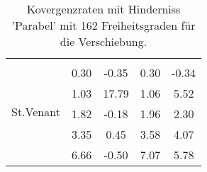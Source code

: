 \begin{table}
\begin{tabular}{c|cc|cc|}
\hline 
\multicolumn{1}{|c|}{\multirow{6}{*}{St.Venant}} &\multicolumn{1}{|c|}{} & \multicolumn{1}{|c|}{} & \multicolumn{1}{|c|}{} & \multicolumn{1}{|c|}{} \\ 
\multicolumn{1}{|c|}{} & \multicolumn{1}{|c|}{      0.30} & \multicolumn{1}{|c|}{     -0.35} & \multicolumn{1}{|c|}{      0.30} & \multicolumn{1}{|c|}{     -0.34} \\ 
\multicolumn{1}{|c|}{} & \multicolumn{1}{|c|}{      1.03} & \multicolumn{1}{|c|}{     17.79} & \multicolumn{1}{|c|}{      1.06} & \multicolumn{1}{|c|}{      5.52} \\ 
\multicolumn{1}{|c|}{} & \multicolumn{1}{|c|}{      1.82} & \multicolumn{1}{|c|}{     -0.18} & \multicolumn{1}{|c|}{      1.96} & \multicolumn{1}{|c|}{      2.30} \\ 
\multicolumn{1}{|c|}{} & \multicolumn{1}{|c|}{      3.35} & \multicolumn{1}{|c|}{      0.45} & \multicolumn{1}{|c|}{      3.58} & \multicolumn{1}{|c|}{      4.07} \\ 
\multicolumn{1}{|c|}{} & \multicolumn{1}{|c|}{      6.66} & \multicolumn{1}{|c|}{     -0.50} & \multicolumn{1}{|c|}{      7.07} & \multicolumn{1}{|c|}{      5.78} \\ 
\hline 
\end{tabular}\caption{Kovergenzraten mit Hinderniss 'Parabel' mit 162 Freiheitsgraden für die Verschiebung.}\label{tab:Rate_Parabel_level2}
\end{table} 
